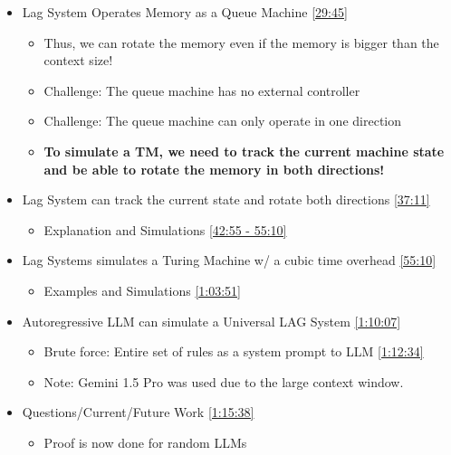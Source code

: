 \documentclass[12pt, twoside]{article}
\begin{document}
\begin{itemize}
    \item Lag System Operates Memory as a Queue Machine \href{https://youtu.be/ShM-T4oeYjw?si=kr1ip53SZuYQ0LT0&t=1785}{[29:45]}
    \begin{itemize}
        \item Thus, we can rotate the memory even if the memory is bigger than the context size!
        \item Challenge: The queue machine has no external controller
        \item Challenge: The queue machine can only operate in one direction
        \item \textbf{To simulate a TM, we need to track the current machine state and be able to rotate the memory in both directions!}
    \end{itemize}
    \item Lag System can track the current state and rotate both directions \href{https://youtu.be/ShM-T4oeYjw?si=Htp1M1CRSuv7LrUi&t=2231}{[37:11]}
    \begin{itemize}
        \item Explanation and Simulations \href{https://youtu.be/ShM-T4oeYjw?si=2pF9RDl6k08Ehjk_&t=2575}{[42:55 - 55:10]}
    \end{itemize}
    \item Lag Systems simulates a Turing Machine w/ a cubic time overhead \href{https://youtu.be/ShM-T4oeYjw?si=Ara_vbPniwxN2itp&t=3310}{[55:10]}
    \begin{itemize}
        \item Examples and Simulations \href{https://youtu.be/ShM-T4oeYjw?si=FZf4ewMOwBZ4L3k8&t=3831}{[1:03:51]}
    \end{itemize}
    \item Autoregressive LLM can simulate a Universal LAG System \href{https://youtu.be/ShM-T4oeYjw?si=BXQV-wcwkZz7P8BO&t=4207}{[1:10:07]}
    \begin{itemize}
        \item Brute force: Entire set of rules as a system prompt to LLM \href{https://youtu.be/ShM-T4oeYjw?si=kNkUy45FYvbykU2V&t=4354}{[1:12:34]}
        \item Note: Gemini 1.5 Pro was used due to the large context window.
    \end{itemize}
    \item Questions/Current/Future Work \href{https://youtu.be/ShM-T4oeYjw?si=iPwZ_a8Hqi404gec&t=4538}{[1:15:38]}
    \begin{itemize}
        \item Proof is now done for random LLMs
    \end{itemize}
\end{itemize}
\end{document}
